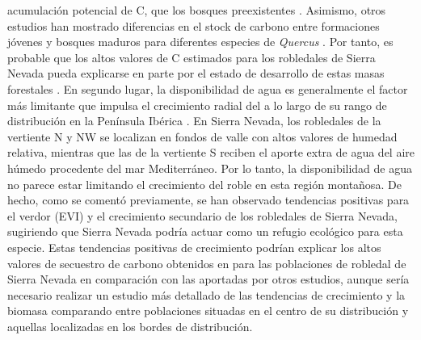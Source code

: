 acumulación potencial de C, que los bosques preexistentes \autocite{VilaCabreraetal2017NewForests}. Asimismo, otros estudios han mostrado diferencias en el stock de carbono entre formaciones jóvenes y bosques maduros para diferentes especies de \emph{Quercus} \autocite{Bruckmanetal2011CarbonPools,Cotillasetal2016AbovegroundBelowground}. Por tanto, es probable que los altos valores de C estimados para los robledales de Sierra Nevada pueda explicarse en parte por el estado de desarrollo de estas masas forestales \autocite{Makinecietal2015EcosystemCarbon}. En segundo lugar, la disponibilidad de agua es generalmente el factor más limitante que impulsa el crecimiento radial del \Qp a lo largo de su rango de distribución en la Península Ibérica \autocite{GeaIzquierdoCanellas2014LocalClimate}. En Sierra Nevada, los robledales de la vertiente N y NW se localizan en fondos de valle con altos valores de humedad relativa, mientras que las de la vertiente S reciben el aporte extra de agua del aire húmedo procedente del mar Mediterráneo. Por lo tanto, la disponibilidad de agua no parece estar limitando el crecimiento del roble en esta región montañosa. De hecho, como se comentó previamente, se han observado tendencias positivas para el verdor (EVI) y el crecimiento secundario de los robledales de Sierra Nevada, sugiriendo que Sierra Nevada podría actuar como un refugio ecológico para esta especie. Estas tendencias positivas de crecimiento podrían explicar los altos valores de secuestro de carbono obtenidos en para las poblaciones de robledal de Sierra Nevada en comparación con las aportadas por otros estudios, aunque sería necesario realizar un estudio más detallado de las tendencias de crecimiento y la biomasa comparando entre poblaciones situadas en el centro de su distribución y aquellas localizadas en los bordes de distribución.  

